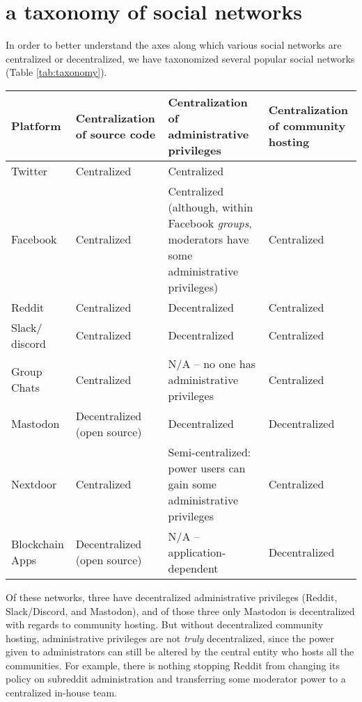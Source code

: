 \documentclass[sigconf,authordraft]{acmart}
\begin{document}
\section{a taxonomy of social networks}

In order to better understand the axes along which various social networks are centralized or decentralized, we have taxonomized several popular social networks  (Table \ref{tab:taxonomy}).


\begin{table*}
  \caption{A taxonomy of online networks}
  \label{tab:taxonomy}
  \begin{tabularx}{\textwidth}{llXX}
    \toprule
    Platform & Centralization of source code & Centralization of administrative privileges & Centralization of community hosting \\
    \midrule
    Twitter  & Centralized & Centralized\\
    Facebook & Centralized & Centralized (although, within Facebook {\itshape groups}, moderators have some administrative privileges) & Centralized\\
    Reddit   & Centralized & Decentralized & Centralized  \\
    Slack/ discord & Centralized & Decentralized & Centralized \\
    Group Chats & Centralized & N/A -- no one has administrative privileges & Centralized \\
    Mastodon & Decentralized (open source) & Decentralized & Decentralized\\
    Nextdoor & Centralized & Semi-centralized: power users can gain some administrative privileges & Centralized \\
    Blockchain Apps & Decentralized (open source) & N/A -- application-dependent & Decentralized\\
    \bottomrule
  \end{tabularx}
\end{table*}

Of these networks, three have decentralized administrative privileges (Reddit, Slack/Discord, and Mastodon), and of those three only Mastodon is decentralized with regards to community hosting. But without decentralized community hosting, administrative privileges are not {\itshape truly} decentralized, since the power given to administrators can still be altered by the central entity who hosts all the communities. For example, there is nothing stopping Reddit from changing its policy on subreddit administration and transferring some moderator power to a centralized in-house team.
\end{document}
